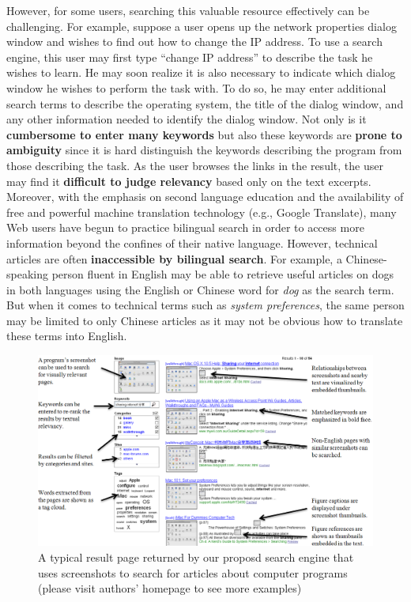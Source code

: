 \documentclass{www2010-submission}
\begin{document}
However, for some users, searching this valuable resource
effectively can be challenging. For example, suppose a user opens
up the network properties dialog window and wishes to find out how
to change the IP address. To use a search engine, this user may
first type ``change IP address'' to describe the task he wishes to
learn. He may soon realize it is also necessary to indicate which
dialog window he wishes to perform the task with. To do so, he may
enter additional search terms to describe the operating system,
the title of the dialog window, and any other information needed
to identify the dialog window. Not only is it \textbf{cumbersome
to enter many keywords} but also these keywords are \textbf{prone
to ambiguity} since it is hard distinguish the keywords describing
the program from those describing the task. As the user
browses the links in the result, the user may find it
\textbf{difficult to judge relevancy} based only on the text
excerpts. Moreover, with the emphasis on second language education and the
availability of free and powerful machine translation technology
(e.g., Google Translate),  many Web users have begun to practice
bilingual search in order to access more information beyond the
confines of their native language. However, technical articles are
often \textbf{inaccessible by bilingual search}. For example, a
Chinese-speaking person fluent in English may be able to retrieve
useful articles on dogs in both languages using the English or
Chinese word for \emph{dog} as the search term. But when it comes
to technical terms such as \emph{system preferences}, the same
person may be limited to only Chinese articles as it may not be
obvious how to translate these terms into English.


\begin{figure}
\includegraphics[width=2\columnwidth]{figure/main_result.png}
\caption{A typical result page returned by our
proposd search engine that uses screenshots to search 
for articles about computer programs (please visit
authors' homepage to see more examples)}
\label{fig:main_result}
\end{figure}
\end{document}
